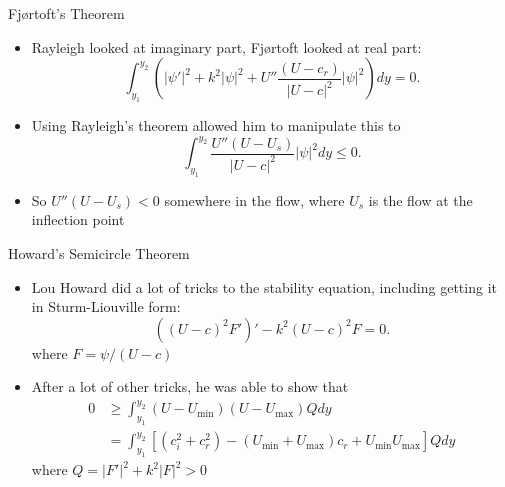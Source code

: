 \documentclass[landscape]{seminar}
\begin{document}
\begin{slide}

\begin{center}Fj\o rtoft's Theorem\end{center}

\begin{itemize}
  \item Rayleigh looked at imaginary part, Fj\o rtoft looked at real part:
\begin{equation*}
\int_{y_1}^{y_2} \left(|\psi'|^2 + k^2 |\psi|^2 + U'' \frac{(U - c_r)}{|U - c|^2}|\psi|^2 \right) dy = 0.
\end{equation*}

  \item Using Rayleigh's theorem allowed him to manipulate this to
\begin{equation}
\int_{y_1}^{y_2} \frac{U'' (U - U_s)}{|U - c|^2} |\psi|^2 dy \leq 0.
\end{equation}

  \item So $U'' (U - U_s) < 0$ somewhere in the flow, where $U_s$ is the flow at the inflection point

\end{itemize}

\end{slide}
\begin{slide}

\begin{center}Howard's Semicircle Theorem\end{center}

\begin{itemize}
  \item Lou Howard did a lot of tricks to the stability equation, including getting it in Sturm-Liouville form:
\begin{equation}
((U-c)^2 F')' - k^2 (U-c)^2 F = 0.
\end{equation}
where $F = \psi / (U-c)$

  \item After a lot of other tricks, he was able to show that
\begin{equation*}
\begin{split}
0 &\geq \int_{y_1}^{y_2} (U - U_{\min}) (U - U_{\max}) Q dy \\
&= \int_{y_1}^{y_2} \left[(c_i^2 + c_r^2) - (U_{\min} + U_{\max})c_r + U_{\min} U_{\max} \right] Q dy
\end{split}
\end{equation*}
where $Q = |F'|^2 + k^2 |F|^2 > 0$

\end{itemize}

\end{slide}
\end{document}
